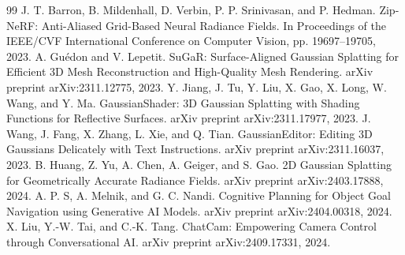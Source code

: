 \documentclass[a4paper, 12pt, centering]{article}
\begin{document}
\begin{thebibliography}{99}
 J. T. Barron, B. Mildenhall, D. Verbin, P. P. Srinivasan, and P. Hedman. Zip-NeRF: Anti-Aliased Grid-Based Neural Radiance Fields. In Proceedings of the IEEE/CVF International Conference on Computer Vision, pp. 19697--19705, 2023.
 A. Gu{\'e}don and V. Lepetit. SuGaR: Surface-Aligned Gaussian Splatting for Efficient 3D Mesh Reconstruction and High-Quality Mesh Rendering. arXiv preprint arXiv:2311.12775, 2023.
 Y. Jiang, J. Tu, Y. Liu, X. Gao, X. Long, W. Wang, and Y. Ma. GaussianShader: 3D Gaussian Splatting with Shading Functions for Reflective Surfaces. arXiv preprint arXiv:2311.17977, 2023.
 J. Wang, J. Fang, X. Zhang, L. Xie, and Q. Tian. GaussianEditor: Editing 3D Gaussians Delicately with Text Instructions. arXiv preprint arXiv:2311.16037, 2023.
 B. Huang, Z. Yu, A. Chen, A. Geiger, and S. Gao. 2D Gaussian Splatting for Geometrically Accurate Radiance Fields. arXiv preprint arXiv:2403.17888, 2024.
 A. P. S, A. Melnik, and G. C. Nandi. Cognitive Planning for Object Goal Navigation using Generative AI Models. arXiv preprint arXiv:2404.00318, 2024.
 X. Liu, Y.-W. Tai, and C.-K. Tang. ChatCam: Empowering Camera Control through Conversational AI. arXiv preprint arXiv:2409.17331, 2024.
\end{thebibliography}
\end{document}
